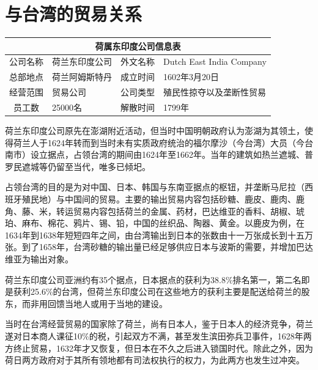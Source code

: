 \documentclass{ctexbook}
\begin{document}
\section{与台湾的贸易关系} 

\begin{tabular}{|c@{：}l|c@{：}l|}
    \multicolumn{4}{c}{荷属东印度公司信息表}\\
    \hline
     公司名称 & 荷兰东印度公司 &外文名称 &Dutch East India Company  \\
    \hline
     总部地点 &荷兰阿姆斯特丹 &成立时间 &1602年3月20日  \\
    \hline
     经营范围 &贸易公司 &公司类型 &殖民性掠夺以及垄断性贸易 \\
    \hline 
     员工数 &25000名& 解散时间 &1799年 \\
    \hline
\end{tabular}
\vspace{3mm}

荷兰东印度公司原先在澎湖附近活动，但当时中国明朝政府认为澎湖为其领土，使得荷兰人于1624年转而到当时未有实质政府统治的福尔摩沙（今台湾）大员（今台南市）设立据点，占领台湾的期间由1624年至1662年。当年的建筑如热兰遮城、普罗民遮城等仍留至当代，唯多已倾圯。


\begin{figwindow}
    占领台湾的目的是为对中国、日本、韩国与东南亚据点的枢钮，并垄断马尼拉（西班牙殖民地）与中国间的贸易。主要的输出贸易内容包括砂糖、鹿皮、鹿肉、鹿角、藤、米，转运贸易内容包括荷兰的金属、药材，巴达维亚的香料、胡椒、琥珀、麻布、棉花、鸦片、锡、铅，中国的丝织品、陶器、黄金。以鹿皮为例，在1634年到1638年短短四年之间，由台湾输出到日本的张数由十一万张成长到十五万张。到了1658年，台湾砂糖的输出量已经足够供应日本与波斯的需要，并增加巴达维亚为输出对象。
\end{figwindow}

荷兰东印度公司亚洲约有35个据点，日本据点的获利为38.8\%排名第一，第二名即是获利25.6\%的台湾，但荷兰东印度公司在这些地方的获利主要是配送给荷兰的股东，而非用回馈当地人或用于当地的建设。

当时在台湾经营贸易的国家除了荷兰，尚有日本人，鉴于日本人的经济竞争，荷兰遂对日本商人课征10\%的税，引起双方不满，甚至发生滨田弥兵卫事件，1628年两方终止贸易，1632年才又恢复，但日本在不久之后进入锁国时代。除此之外，因为荷日两方政府对于其所有领地都有司法权执行的权力，为此两方也发生过冲突。
\end{document}
